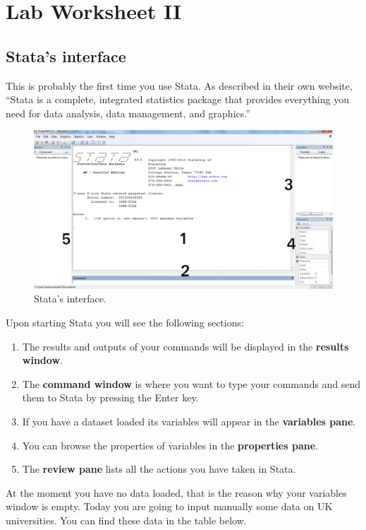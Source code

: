 \documentclass{article}
\begin{document}
 
\section*{\hfil Lab Worksheet II \hfil}
\subsection*{Stata's interface}

This is probably the first time you use Stata. As described in their own website, ``Stata is a complete, integrated statistics package that provides everything you need for data analysis, data management, and graphics.''
 
\begin{figure}[H]
	\includegraphics[width=\linewidth]{Stata_Interface.png}
	\caption{Stata's interface.}
\end{figure}

Upon starting Stata you will see the following sections:

\begin{enumerate}
	\item The results and outputs of your commands will be displayed in the \textbf{results window}.
	\item The \textbf{command window} is where you want to type your commands and send them to Stata by pressing the Enter key.
	\item If you have a dataset loaded its variables will appear in the \textbf{variables pane}.
	\item You can browse the properties of variables in the \textbf{properties pane}.
	\item The \textbf{review pane} lists all the actions you have taken in Stata.  
\end{enumerate}

At the moment you have no data loaded, that is the reason why your variables window is empty. Today you are going to input manually some data on UK universities. You can find these data in the table below.
\end{document}
